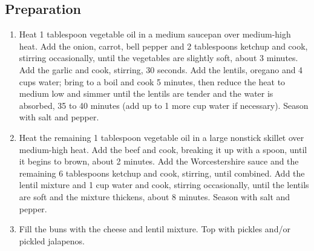 \subsection{Preparation}
\begin{enumerate}
    \item Heat 1 tablespoon vegetable oil in a medium saucepan over medium-high heat. Add the onion, carrot, bell pepper and 2 tablespoons ketchup and cook, stirring occasionally, until the vegetables are slightly soft, about 3 minutes. Add the garlic and cook, stirring, 30 seconds. Add the lentils, oregano and 4 cups water; bring to a boil and cook 5 minutes, then reduce the heat to medium low and simmer until the lentils are tender and the water is absorbed, 35 to 40 minutes (add up to 1 more cup water if necessary). Season with salt and pepper.
    \item Heat the remaining 1 tablespoon vegetable oil in a large nonstick skillet over medium-high heat. Add the beef and cook, breaking it up with a spoon, until it begins to brown, about 2 minutes. Add the Worcestershire sauce and the remaining 6 tablespoons ketchup and cook, stirring, until combined. Add the lentil mixture and 1 cup water and cook, stirring occasionally, until the lentils are soft and the mixture thickens, about 8 minutes. Season with salt and pepper.
    \item Fill the buns with the cheese and lentil mixture. Top with pickles and/or pickled jalapenos.
\end{enumerate}
